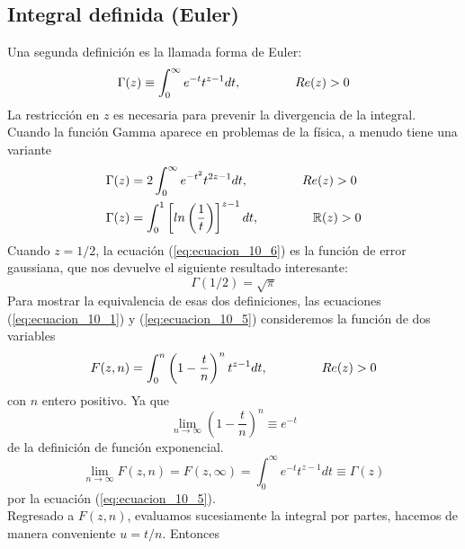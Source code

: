 \subsection{Integral definida (Euler)}
Una segunda definición es la llamada forma de Euler:
\begin{equation}
\Gamma (z) \equiv \int_{0}^{\infty} e^{-t} t^{z-1} dt, \hspace{1.5cm} Re(z) > 0
\label{eq:ecuacion_10_5}
\end{equation}
La restricción en $z$ es necesaria para prevenir la divergencia de la integral. Cuando la función Gamma aparece en problemas de la física, a menudo tiene una variante
\begin{eqnarray}
\Gamma (z) &= 2 \int_{0}^{\infty} e^{-t^{2}} t^{2z-1} dt, \hspace{1.5cm} Re(z) > 0  \label{eq:ecuacion_10_6} \\
\Gamma (z) &=  \int_{0}^{1} \left[ ln\left(\dfrac{1}{t} \right) \right]^{z-1} dt, \hspace{1.5cm} \mathbb{R}(z) > 0 \label{eq:ecuacion_10_7}
\end{eqnarray}
Cuando $z=1/2$, la ecuación (\ref{eq:ecuacion_10_6}) es la función de error gaussiana, que nos devuelve el siguiente resultado interesante:
\begin{equation}
\Gamma (1/2) = \sqrt{\pi}
\label{eq:ecuacion_10_8}
\end{equation}
Para mostrar la equivalencia de esas dos definiciones, las ecuaciones (\ref{eq:ecuacion_10_1}) y (\ref{eq:ecuacion_10_5}) consideremos la función de dos variables
\begin{equation}
F(z,n) = \int_{0}^{n} \left( 1 - \dfrac{t}{n} \right)^{n} t^{z-1} dt, \hspace{1.5cm} Re(z) > 0
\label{eq:ecuacion_10_9}
\end{equation}
con $n$ entero positivo. Ya que
\begin{equation}
\lim_{n \to \infty} \left( 1 - \dfrac{t}{n} \right)^{n} \equiv e^{-t}
\label{eq:ecuacion_10_10}
\end{equation}
de la definición de función exponencial.
\begin{equation}
\lim_{n \to \infty} F(z,n) = F(z,\infty) = \int_{0}^{\infty} e^{-t} t^{z-1} dt \equiv \Gamma (z)
\label{eq:ecuacione_10_11}
\end{equation}
por la ecuación (\ref{eq:ecuacion_10_5}).
\\
Regresado a $F(z,n)$, evaluamos sucesiamente la integral por partes, hacemos de manera conveniente $u = t/n$. Entonces
